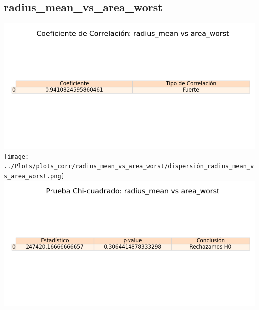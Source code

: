 \documentclass[a4paper, 12pt]{article}
\begin{document}
\subsection{radius\_mean\_vs\_area\_worst}
    \includegraphics[width = \textwidth]{../Plots/plots_corr/radius_mean_vs_area_worst/coeficiente_correlacion_radius_mean_vs_area_worst.png}
    \texttt{[image: ../Plots/plots\_corr/radius\_mean\_vs\_area\_worst/dispersión\_radius\_mean\_vs\_area\_worst.png]}
    \includegraphics[width = \textwidth]{../Plots/plots_corr/radius_mean_vs_area_worst/chi_cuadrado_radius_mean_vs_area_worst.png}
\end{document}
